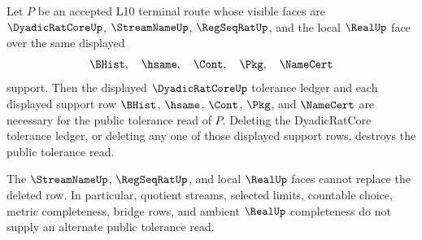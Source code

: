 \begin{theorem}
\label{thm:dyadicratcore-terminal-tolerance-support-minimality}
Let $P$ be an accepted L10 terminal route whose visible faces are $\DyadicRatCoreUp$, $\StreamNameUp$, $\RegSeqRatUp$, and the local $\RealUp$ face over the same displayed
$$
\BHist,\quad \hsame,\quad \Cont,\quad \Pkg,\quad \NameCert
$$
support. Then the displayed $\DyadicRatCoreUp$ tolerance ledger and each displayed support row $\BHist$, $\hsame$, $\Cont$, $\Pkg$, and $\NameCert$ are necessary for the public tolerance read of $P$. Deleting the DyadicRatCore tolerance ledger, or deleting any one of those displayed support rows, destroys the public tolerance read.

The $\StreamNameUp$, $\RegSeqRatUp$, and local $\RealUp$ faces cannot replace the deleted row. In particular, quotient streams, selected limits, countable choice, metric completeness, bridge rows, and ambient $\RealUp$ completeness do not supply an alternate public tolerance read.
\end{theorem}

